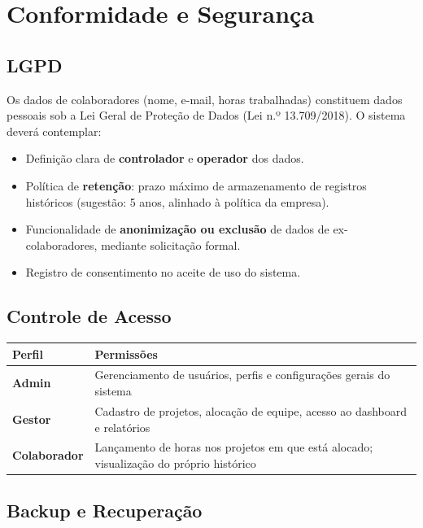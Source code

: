 \documentclass[12pt,a4paper]{article}
\begin{document}
\section{Conformidade e Segurança}

\subsection{LGPD}

Os dados de colaboradores (nome, e-mail, horas trabalhadas) constituem dados pessoais sob a
Lei Geral de Proteção de Dados (Lei n.º 13.709/2018). O sistema deverá contemplar:

\begin{itemize}[leftmargin=1.5em]
  \item Definição clara de \textbf{controlador} e \textbf{operador} dos dados.
  \item Política de \textbf{retenção}: prazo máximo de armazenamento de registros históricos
    (sugestão: 5 anos, alinhado à política da empresa).
  \item Funcionalidade de \textbf{anonimização ou exclusão} de dados de ex-colaboradores,
    mediante solicitação formal.
  \item Registro de consentimento no aceite de uso do sistema.
\end{itemize}

\subsection{Controle de Acesso}

\begin{tabularx}{\linewidth}{>{\bfseries}lX}
  \toprule
  Perfil & Permissões \\
  \midrule
  Admin       & Gerenciamento de usuários, perfis e configurações gerais do sistema \\
  Gestor      & Cadastro de projetos, alocação de equipe, acesso ao dashboard e relatórios \\
  Colaborador & Lançamento de horas nos projetos em que está alocado; visualização do próprio histórico \\
  \bottomrule
\end{tabularx}

\subsection{Backup e Recuperação}
\end{document}
